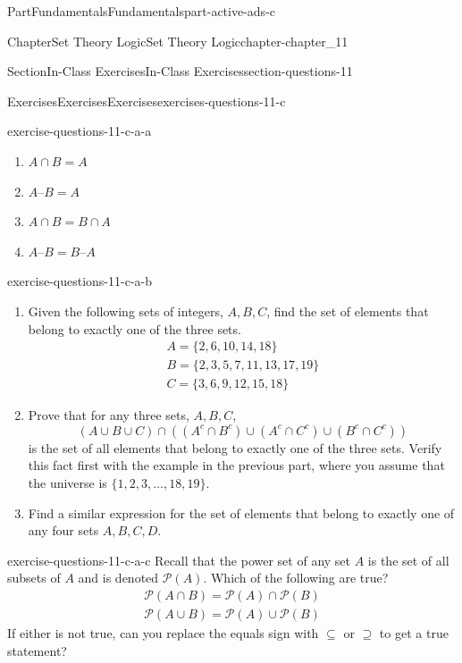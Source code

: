 \documentclass[oneside,10pt,]{book}
\numberwithin{equation}{section}
\begin{document}
\begin{partptx}{Part}{Fundamentals}{}{Fundamentals}{}{}{part-active-ads-c}
\begin{chapterptx}{Chapter}{Set Theory Logic}{}{Set Theory Logic}{}{}{chapter-chapter_11}
\begin{sectionptx}{Section}{In-Class Exercises}{}{In-Class Exercises}{}{}{section-questions-11}
\begin{exercises-subsection-numberless}{Exercises}{Exercises}{}{Exercises}{}{}{exercises-questions-11-c}
\begin{exercisegroup}
\begin{divisionexerciseeg}{1}{}{}{exercise-questions-11-c-a-a}
\begin{enumerate}[label=(\alph*)]
\item{}\(\displaystyle A\cap B = A\)%
\item{}\(\displaystyle A–B = A\)%
\item{}\(\displaystyle A\cap B = B\cap A\)%
\item{}\(\displaystyle A–B = B–A\)%
\end{enumerate}
%
\end{divisionexerciseeg}%
\begin{divisionexerciseeg}{2}{}{}{exercise-questions-11-c-a-b}%
%
\begin{enumerate}[label=(\alph*)]
\item{}Given the following sets of integers, \(A, B, C\), find the set of elements that belong to exactly one of the three sets.%
\begin{gather*}
A=\{2,6,10,14,18\}\\
B=\{2,3,5,7,11,13,17,19\}\\
C=\{3,6,9,12,15,18\}
\end{gather*}
%
\item{}Prove that for any three sets, \(A, B, C\),%
\begin{equation*}
(A \cup B \cup C)\cap ((A^c \cap B^c)\cup (A^c \cap C^c)\cup (B^c \cap C^c))
\end{equation*}
is the set of all elements that belong to exactly one of the three sets.  Verify this fact first with the example in the previous part, where you assume that the universe is \(\{1,2,3,\dots,18,19\}\).%
\item{}Find a similar expression for the set of elements that belong to exactly one of any four sets \(A, B, C, D.\)%
\end{enumerate}
%
\end{divisionexerciseeg}%
\begin{divisionexerciseeg}{3}{}{}{exercise-questions-11-c-a-c}%
Recall that the power set of any set \(A\) is the set of all subsets of \(A\) and is denoted \(\mathcal{P}(A)\).  Which of the following are true?%
\begin{gather*}
\mathcal{P}(A \cap B) = \mathcal{P}(A) \cap \mathcal{P}(B)\\
\mathcal{P}(A \cup B) = \mathcal{P}(A) \cup \mathcal{P}(B)
\end{gather*}
If either is not true, can you replace the equals sign with \(\subseteq\) or \(\supseteq\) to get a true statement?%
\end{divisionexerciseeg}%
\end{exercisegroup}
\par\medskip\noindent

\end{exercises-subsection-numberless}
\end{sectionptx}
\end{chapterptx}
\end{partptx}
\end{document}
